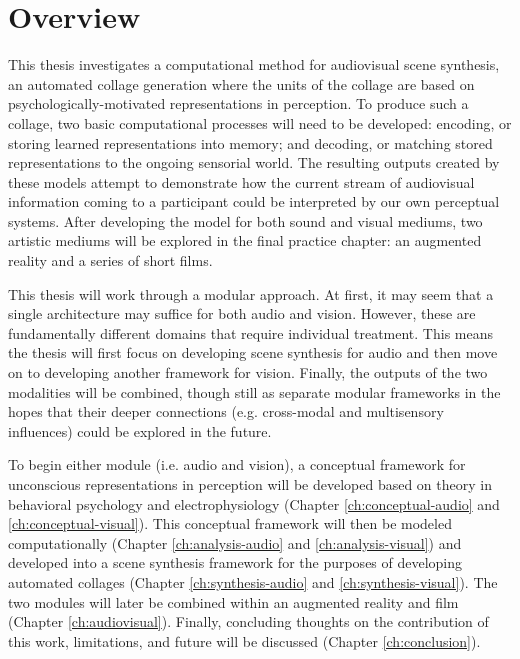 \documentclass[a4paper,10pt,final]{ThesisStyle}
\begin{document}
\section{Overview}

This thesis investigates a computational method for audiovisual scene synthesis, an automated collage generation where the units of the collage are based on psychologically-motivated representations in perception.  To produce such a collage, two basic computational processes will need to be developed: encoding, or storing learned representations into memory; and decoding, or matching stored representations to the ongoing sensorial world.  The resulting outputs created by these models attempt to demonstrate how the current stream of audiovisual information coming to a participant could be interpreted by our own perceptual systems.  After developing the model for both sound and visual mediums, two artistic mediums will be explored in the final practice chapter: an augmented reality and a series of short films.

This thesis will work through a modular approach.  At first, it may seem that a single architecture may suffice for both audio and vision.  However, these are fundamentally different domains that require individual treatment.  This means the thesis will first focus on developing scene synthesis for audio and then move on to developing another framework for vision.  Finally, the outputs of the two modalities will be combined, though still as separate modular frameworks in the hopes that their deeper connections (e.g. cross-modal and multisensory influences) could be explored in the future.  

To begin either module (i.e. audio and vision), a conceptual framework for unconscious representations in perception will be developed based on theory in behavioral psychology and electrophysiology (Chapter \ref{ch:conceptual-audio} and \ref{ch:conceptual-visual}).  This conceptual framework will then be modeled computationally (Chapter \ref{ch:analysis-audio} and \ref{ch:analysis-visual}) and developed into a scene synthesis framework for the purposes of developing automated collages (Chapter \ref{ch:synthesis-audio} and \ref{ch:synthesis-visual}).  The two modules will later be combined within an augmented reality and film (Chapter \ref{ch:audiovisual}).  Finally, concluding thoughts on the contribution of this work, limitations, and future will be discussed (Chapter \ref{ch:conclusion}).  
\end{document}
